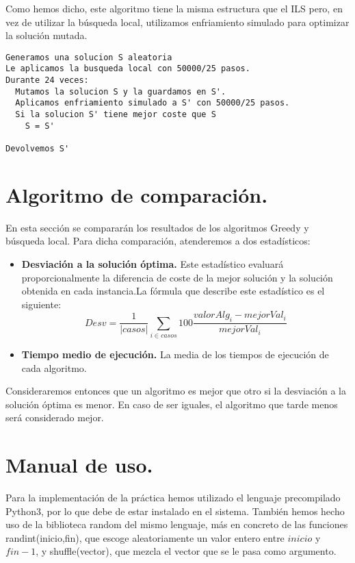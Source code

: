 Como hemos dicho, este algoritmo tiene la misma estructura que el ILS pero, en vez de utilizar la búsqueda local, utilizamos enfriamiento simulado para optimizar la solución mutada.

\noindent\hrulefill
\begin{lstlisting}
Generamos una solucion S aleatoria
Le aplicamos la busqueda local con 50000/25 pasos.
Durante 24 veces:
  Mutamos la solucion S y la guardamos en S'.
  Aplicamos enfriamiento simulado a S' con 50000/25 pasos.
  Si la solucion S' tiene mejor coste que S
    S = S'

Devolvemos S'
\end{lstlisting}
\noindent\hrulefill


\newpage

\section{Algoritmo de comparación.}
En esta sección se compararán los resultados de los algoritmos Greedy y búsqueda local. Para dicha comparación, atenderemos a dos estadísticos:\\

\begin{itemize}
	\item \textbf{Desviación a la solución óptima.} Este estadístico evaluará proporcionalmente la diferencia de coste de la mejor solución y la solución obtenida en cada instancia.La fórmula que describe este estadístico es el siguiente:
	\[Desv = \dfrac{1}{ \left| casos\right|}\sum_{i \in casos}100\dfrac{valorAlg_i - mejorVal_i}{mejorVal_i} \]
	
	\item \textbf{Tiempo medio de ejecución.} La media de los tiempos de ejecución de cada algoritmo.
\end{itemize}

Consideraremos entonces que un algoritmo es mejor que otro si la desviación a la solución óptima es menor. En caso de ser iguales, el algoritmo que tarde menos será considerado mejor.

\newpage

\section{Manual de uso.}

Para la implementación de la práctica hemos utilizado el lenguaje precompilado Python3, por lo que debe de estar instalado en el sistema. También hemos hecho uso de la biblioteca random del mismo lenguaje, más en concreto de las funciones randint(inicio,fin), que escoge aleatoriamente un valor entero entre  $inicio$ y $fin-1$, y shuffle(vector), que mezcla el vector que se le pasa como argumento.\\

